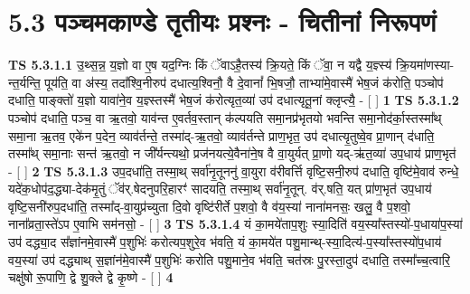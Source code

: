\documentclass[17pt]{extarticle}
\begin{document}
     \section*{ 5.3      पञ्चमकाण्डे तृतीयः प्रश्नः - चितीनां निरूपणं }
                                        \textbf{ TS 5.3.1.1} \newline
                  उ॒थ्स॒न्न॒ य॒ज्ञो वा ए॒ष यद॒ग्निः किं ॅवाऽहै॒तस्य॑ क्रि॒यते॒ किं ॅवा॒ न यद्वै य॒ज्ञ्स्य॑ क्रि॒यमा॑णस्या-न्त॒र्यन्ति॒ पूय॑ति॒ वा अ॑स्य॒ तदा᳚श्वि॒नीरुप॑ दधात्य॒श्विनौ॒ वै दे॒वानां᳚ भि॒षजौ॒ ताभ्या॑मे॒वास्मै॑ भेष॒जं क॑रोति॒ पञ्चोप॑ दधाति॒ पाङ्क्तो॑ य॒ज्ञो यावा॑ने॒व य॒ज्ञ्स्तस्मै॑ भेष॒जं क॑रोत्यृत॒व्या॑ उप॑ दधात्यृतू॒नां क्लृप्त्यै॒ - [  ] \textbf{  1} \newline
                  \newline
                                \textbf{ TS 5.3.1.2} \newline
                  पञ्चोप॑ दधाति॒ पञ्च॒ वा ऋ॒तवो॒ याव॑न्त ए॒वर्तव॒स्तान् क॑ल्पयति समा॒नप्र॑भृतयो भवन्ति समा॒नोद॑र्का॒स्तस्मा᳚थ् समा॒ना ऋ॒तव॒ एके॑न प॒देन॒ व्याव॑र्तन्ते॒ तस्मा॑द्-ऋ॒तवो॒ व्याव॑र्तन्ते प्राण॒भृत॒ उप॑ दधात्यृ॒तुष्वे॒व प्रा॒णान् द॑धाति॒ तस्मा᳚थ् समा॒नाः सन्त॑ ऋ॒तवो॒ न जी᳚र्यन्त्यथो॒ प्रज॑नयत्ये॒वैना॑ने॒ष वै वा॒युर्यत् प्रा॒णो यद्-ऋ॑त॒व्या॑ उप॒धाय॑ प्राण॒भृत॑ - [  ] \textbf{  2} \newline
                  \newline
                                \textbf{ TS 5.3.1.3} \newline
                  उप॒दधा॑ति॒ तस्मा॒थ् सर्वा॑नृ॒तूननु॑ वा॒युरा व॑रीवर्त्ति वृष्टि॒सनी॒रुप॑ दधाति॒ वृष्टि॑मे॒वाव॑ रुन्धे॒ यदे॑क॒धोप॑द॒द्ध्या-देक॑मृ॒तुं ॅव॑र्.षेदनुपरि॒हारꣳ॑ सादयति॒ तस्मा॒थ् सर्वा॑नृ॒तून्. व॑र्.षति॒ यत् प्रा॑ण॒भृत॑ उप॒धाय॑ वृष्टि॒सनी॑रुप॒दधा॑ति॒ तस्मा᳚द्-वा॒युप्र॑च्युता दि॒वो वृष्टि॑रीर्ते प॒शवो॒ वै व॑य॒स्या॑ नाना॑मनसः॒ खलु॒ वै प॒शवो॒ नाना᳚व्रता॒स्ते॑ऽप ए॒वाभि सम॑नसो॒ - [  ] \textbf{  3} \newline
                  \newline
                                \textbf{ TS 5.3.1.4} \newline
                  यं का॒मये॑ताप॒शुः स्या॒दिति॑ वय॒स्या᳚स्तस्यो॑-प॒धाया॑प॒स्या॑ उप॑ दद्ध्या॒द स᳚ज्ञांनमे॒वास्मै॑ प॒शुभिः॑ करोत्यप॒शुरे॒व भ॑वति॒ यं का॒मये॑त पशु॒मान्थ्-स्या॒दित्य॑-प॒स्या᳚स्तस्यो॑प॒धाय॑ वय॒स्या॑ उप॑ दद्ध्याथ् स॒ज्ञांन॑मे॒वास्मै॑ प॒शुभिः॑ करोति पशु॒माने॒व भ॑वति॒ चत॑स्रः पु॒रस्ता॒दुप॑ दधाति॒ तस्मा᳚च्च॒त्वारि॒ चक्षु॑षो रू॒पाणि॒ द्वे शु॒क्ले द्वे कृ॒ष्णे - [  ] \textbf{  4} \newline
                  \newline
\end{document}
